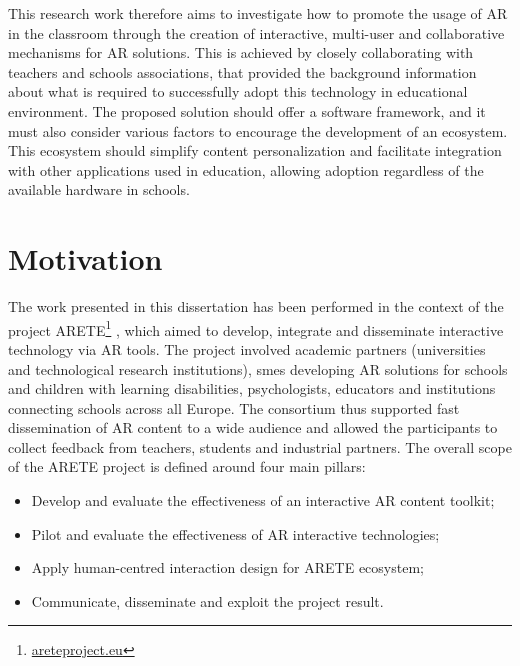 This research work therefore aims to investigate how to promote the usage of AR in the classroom through the creation of interactive, multi-user and collaborative mechanisms for AR solutions. This is achieved by closely collaborating with teachers and schools associations, that provided the background information about what is required to successfully adopt this technology in educational environment. The proposed solution should offer a software framework, and it must also consider various factors to encourage the development of an ecosystem. This ecosystem should simplify content personalization and facilitate integration with other applications used in education, allowing adoption regardless of the available hardware in schools.

\section{Motivation}\label{sec:motivation}
The work presented in this dissertation has been performed in the context of the project ARETE\footnote{\url{areteproject.eu}} \citep{masneri2020work}, which aimed to develop, integrate and disseminate interactive technology via AR tools. The project involved academic partners (universities and technological research institutions), \glspl{sme} developing AR solutions for schools and children with learning disabilities, psychologists, educators and institutions connecting schools across all Europe. The consortium thus supported fast dissemination of AR content to a wide audience and allowed the participants to collect feedback from teachers, students and industrial partners. The overall scope of the ARETE project is defined around four main pillars:

\begin{itemize}
    \item Develop and evaluate the effectiveness of an interactive AR content toolkit;
    \item Pilot and evaluate the effectiveness of AR interactive technologies;
    \item Apply human-centred interaction design for ARETE ecosystem;
    \item Communicate, disseminate and exploit the project result.
\end{itemize}


